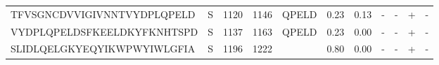 \begin{tabular}{llrrlrrllll}
TFVSGNCDVVIGIVNNTVYDPLQPELD &       S &   1120 &  1146 &              QPELD &            0.23 &             0.13 &      - &       - &      + &       - \\
VYDPLQPELDSFKEELDKYFKNHTSPD &       S &   1137 &  1163 &              QPELD &            0.23 &             0.00 &      - &       - &      + &       - \\
SLIDLQELGKYEQYIKWPWYIWLGFIA &       S &   1196 &  1222 &                    &            0.80 &             0.00 &      - &       - &      + &       - \\
\bottomrule
\end{tabular}
